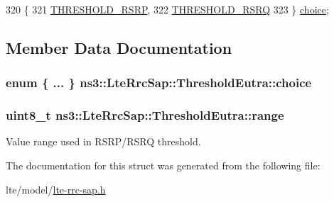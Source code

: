 \begin{DoxyCode}
320     \{
321       \hyperlink{structns3_1_1LteRrcSap_1_1ThresholdEutra_ad3ed2704b836132980dd2e97cb03822ca0663d5baa9382bd755acb712f6ebf707}{THRESHOLD\_RSRP}, 
322       \hyperlink{structns3_1_1LteRrcSap_1_1ThresholdEutra_ad3ed2704b836132980dd2e97cb03822ca6e8bda2b99825f09f53388c29b6402b4}{THRESHOLD\_RSRQ} 
323     \} \hyperlink{structns3_1_1LteRrcSap_1_1ThresholdEutra_a4c7eed6102d1cd143c063ac845095f75}{choice};
\end{DoxyCode}


\subsection{Member Data Documentation}
\subsubsection[{\texorpdfstring{choice}{choice}}]{\setlength{\rightskip}{0pt plus 5cm}enum \{ ... \}   ns3\+::\+Lte\+Rrc\+Sap\+::\+Threshold\+Eutra\+::choice}\hypertarget{structns3_1_1LteRrcSap_1_1ThresholdEutra_a4c7eed6102d1cd143c063ac845095f75}{}\label{structns3_1_1LteRrcSap_1_1ThresholdEutra_a4c7eed6102d1cd143c063ac845095f75}
\subsubsection[{\texorpdfstring{range}{range}}]{\setlength{\rightskip}{0pt plus 5cm}uint8\+\_\+t ns3\+::\+Lte\+Rrc\+Sap\+::\+Threshold\+Eutra\+::range}\hypertarget{structns3_1_1LteRrcSap_1_1ThresholdEutra_abd4950e20a1a93727535e8364bf85b03}{}\label{structns3_1_1LteRrcSap_1_1ThresholdEutra_abd4950e20a1a93727535e8364bf85b03}


Value range used in R\+S\+R\+P/\+R\+S\+RQ threshold. 



The documentation for this struct was generated from the following file\+:\begin{DoxyCompactItemize}
\item 
lte/model/\hyperlink{lte-rrc-sap_8h}{lte-\/rrc-\/sap.\+h}\end{DoxyCompactItemize}
